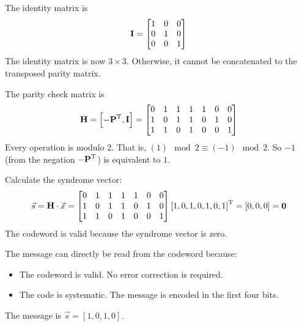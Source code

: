\begin{solution}
\begin{tasks}
		The identity matrix is
		\begin{equation*}
			\bm{\mathrm{I}} = \left[\begin{matrix}
				1 & 0 & 0 \\
				0 & 1 & 0 \\
				0 & 0 & 1
			\end{matrix}\right]
		\end{equation*}
		The identity matrix is now $3 \times 3$. Otherwise, it cannot be concatenated to the transposed parity matrix.
	
		The parity check matrix is
		\begin{equation*}
			\bm{\mathrm{H}} = \left[-\bm{\mathrm{P}}^{\mathrm{T}}, \bm{\mathrm{\mathrm{I}}}\right] = \left[\begin{matrix}
				0 & 1 & 1 & 1 & 1 & 0 & 0 \\
				1 & 0 & 1 & 1 & 0 & 1 & 0 \\
				1 & 1 & 0 & 1 & 0 & 0 & 1
			\end{matrix}\right]
		\end{equation*}
		Every operation is modulo 2. That is, $(1) \mod 2 \equiv (-1) \mod 2$. So $-1$ (from the negation $-\bm{\mathrm{P}}^{\mathrm{T}}$) is equivalent to $1$.
		
		\task
		Calculate the syndrome vector:
		\begin{equation*}
			\vec{s} = \bm{\mathrm{H}} \cdot \vec{x} = \left[\begin{matrix}
				0 & 1 & 1 & 1 & 1 & 0 & 0 \\
				1 & 0 & 1 & 1 & 0 & 1 & 0 \\
				1 & 1 & 0 & 1 & 0 & 0 & 1
			\end{matrix}\right] \left[1, 0, 1, 0, 1, 0, 1\right]^{\mathrm{T}} = \left[0, 0, 0\right] = \bm{\mathrm{\mathrm{0}}}
		\end{equation*}
		The codeword is valid because the syndrome vector is zero.
		
		The message can directly be read from the codeword because:
		\begin{itemize}
			\item The codeword is valid. No error correction is required.
			\item The code is systematic. The message is encoded in the first four bits.
		\end{itemize}
		The message is $\vec{s} = \left[1, 0, 1, 0\right]$.
	\end{tasks}
\end{solution}

